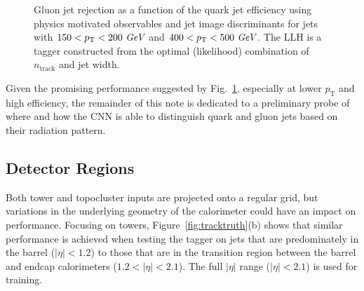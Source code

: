 
\begin{figure}[htpb]
\begin{center}
\caption{Gluon jet rejection as a function of the quark jet efficiency using physics motivated observables and jet image discriminants
for jets with \protect{} $150<p_{{\rm T}}<200~\textit{GeV}$ and \protect{} $400<p_{{\rm T}}<500~\textit{GeV}$.  The LLH is a tagger constructed from the optimal (likelihood) combination of $n_\text{track}$ and jet width. }
\label{fig:classifiers}
\end{center}
\end{figure}

Given the promising performance suggested by Fig.~\ref{fig:classifiers}, especially at lower $p_\text{T}$ and high efficiency, the remainder of this note is dedicated to a preliminary probe of where and how the CNN is able to distinguish quark and gluon jets based on their radiation pattern.


\clearpage

\subsection{Detector Regions}

Both tower and topocluster inputs are projected onto a regular grid, but variations in the underlying geometry of the calorimeter could have an impact on performance.  
Focusing on towers, Figure~\ref{fig:tracktruth}(b) shows that similar performance is achieved when testing the tagger on jets that are predominately in the barrel ($|\eta|<1.2$) 
to those that are in the transition region between the barrel and endcap calorimeters ($1.2<|\eta|<2.1$).
The full $|\eta|$ range ($|\eta|<2.1$) is used for training.


